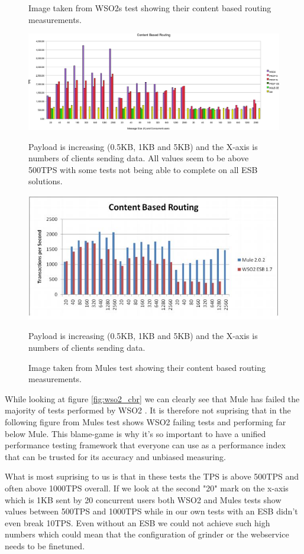 \newpage
\begin{figure}[H]
	\caption{Image taken from WSO2s test \cite{Perera07R3} showing their content based routing measurements.}
	\centerline{\includegraphics[scale=0.43]{img/WSO2_cbr_chart}}
	\label{fig:wso2_cbr}
	Payload is increasing (0.5KB, 1KB and 5KB) and the X-axis is numbers of clients sending data. 
	All values seem to be above 500TPS with some tests not being able to complete on all ESB solutions.

	\caption{Image taken from Mules test \cite{mulesoft08} showing their content based routing measurements.}
	\centerline{\includegraphics[scale=1]{img/MULE_cbr_chart}}
	\label{fig:mule_cbr}
	Payload is increasing (0.5KB, 1KB and 5KB) and the X-axis is numbers of clients sending data. 
\end{figure}
While looking at figure \ref{fig:wso2_cbr} we can clearly see that Mule has failed the majority of tests performed by WSO2 \cite{Perera07R3}. 
It is therefore not suprising that in the following figure from Mules test \cite{mulesoft08} shows WSO2 failing tests and performing far below Mule.
This blame-game is why it's so important to have a unified performance testing framework that everyone can use as a performance index that can be trusted for its accuracy and unbiased measuring.

What is most suprising to us is that in these tests the TPS is above 500TPS and often above 1000TPS overall. 
If we look at the second "20" mark on the x-axis which is 1KB sent by 20 concurrent users both WSO2 and Mules tests show values between 500TPS and 1000TPS while in our own tests with an ESB didn't even break 10TPS.
Even without an ESB we could not achieve such high numbers which could mean that the configuration of grinder or the webservice needs to be finetuned.


